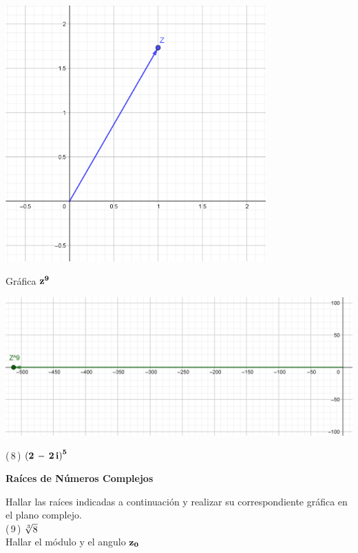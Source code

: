 \documentclass[a4paper,11pt,openany]{book}
\begin{document}
\begin{center}
    \includegraphics[width=10cm]{Gra-Ej-7-1.png}
\end{center}

\textcolor{ao(english)}{} Gráfica $\bf{z^{9}}$

\begin{center}
    \includegraphics[width=15cm]{Gra-Ej-7-2.png}
\end{center}

\textcolor{ao(english)}{(\,8\,)} $\bf{\left(2\,-\,2\,i\right)^{5}}$

\begin{center}
\textbf{Raíces de Números Complejos}
\end{center}

Hallar las raíces indicadas a continuación y realizar su correspondiente gráfica en el plano complejo.\\

\textcolor{ao(english)}{(\,9\,)} $\bf{\sqrt[3]{8}}$\\


\textcolor{ao(english)}{} Hallar el módulo y el angulo $\bf{z_{0}}$
\end{document}
